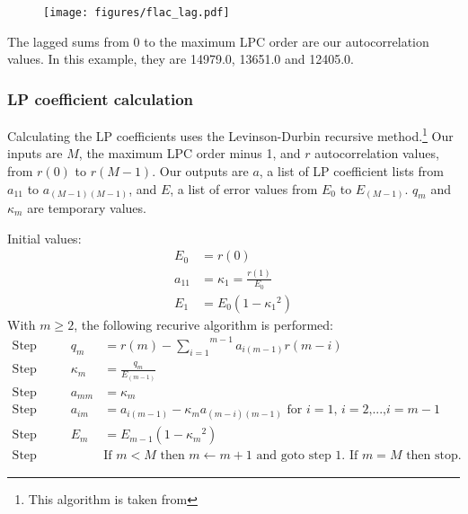 \begin{figure}[h]
\texttt{[image: figures/flac\_lag.pdf]}
\end{figure}

The lagged sums from 0 to the maximum LPC order are our autocorrelation
values.  In this example, they are 14979.0, 13651.0 and 12405.0.

\subsubsection{LP coefficient calculation}


Calculating the LP coefficients uses the Levinson-Durbin recursive method.\footnote{This algorithm is taken from  }
Our inputs are $M$, the maximum LPC order minus 1, and $r$ autocorrelation
values, from $r(0)$ to $r(M - 1)$.
Our outputs are $a$, a list of LP coefficient lists from
$a_{11}$ to $a_{(M - 1)(M - 1)}$, and $E$, a list
of error values from $E_0$ to $E_{(M - 1)}$.
$q_m$ and $\kappa_m$ are temporary values.
\par
\noindent
Initial values:
\begin{align}
E_0 &= r(0) \\
a_{11} &= \kappa_1 = \frac{r(1)}{E_0} \\
E_1 &= E_0 {(1 - {{\kappa_1} ^ 2})}
\end{align}
\noindent
With $m \geq 2$, the following recurive algorithm is performed:
\begin{align}
\text{Step 1. } && q_m &= r(m) - \overset{m - 1}{\underset{i = 1}{\sum}} a_{i(m - 1)}r(m - i) \\
\text{Step 2. } && \kappa_m &= \frac{q_m}{E_{(m - 1)}} \\
\text{Step 3. } && a_{mm} &= \kappa_m \\
\text{Step 4. } && a_{im} &= a_{i(m - 1)} - \kappa_m a_{(m - i)(m - 1)} \text{ for $i = 1$, $i = 2$,...,$i = m - 1$} \\
\text{Step 5. } && E_m &= E_{m - 1}(1 - {\kappa_m} ^ 2) \\
\text{Step 6. } &&& \text{If $m < M$ then $m \leftarrow m + 1$ and goto step 1.  If $m = M$ then stop.}
\end{align}

